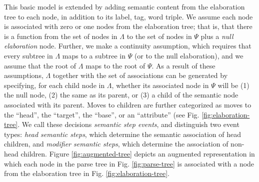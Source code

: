 \documentclass[12pt,letterpaper]{report}
\begin{document}
This basic model is extended by adding semantic content from the
elaboration tree to each node, in addition to its label, tag, word
triple.  We assume each node is associated with zero or one nodes from
the elaboration tree; that is, that there is a function from the set
of nodes in $\Lambda$ to the set of nodes in $\Psi$ plus a {\em null
  elaboration} node.  Further, we make a continuity assumption, which
requires that every subtree in $\Lambda$ maps to a subtree
in $\Psi$ (or to the null elaboration), 
and we assume that the root of $\Lambda$ maps to the root of $\Psi$.
As a result of these assumptions, $\Lambda$ together with the set of
associations can be generated by specifying, for each child node in
$\Lambda$, whether its associated node in $\Psi$ will be (1) the null
node, (2) the same as its parent, or (3) a child of the semantic
node associated with its parent.  Moves to children are further 
categorized as moves to the ``head'', the ``target'',
the ``base'', or an ``attribute'' (see
Fig. \ref{fig:elaboration-tree}.  We call these decisions {\em
semantic step events}, and distinguish two event types: {\em head semantic
steps}, which determine the semantic association of head children,
and {\em modifier semantic steps}, which determine the association of
non-head children.  Figure \ref{fig:augmented-tree} depicts an
augmented representation in which each node in the parse tree in Fig. \ref{fig:parse-tree} is
associated with a node from the elaboration tree in
Fig. \ref{fig:elaboration-tree}.
\end{document}
